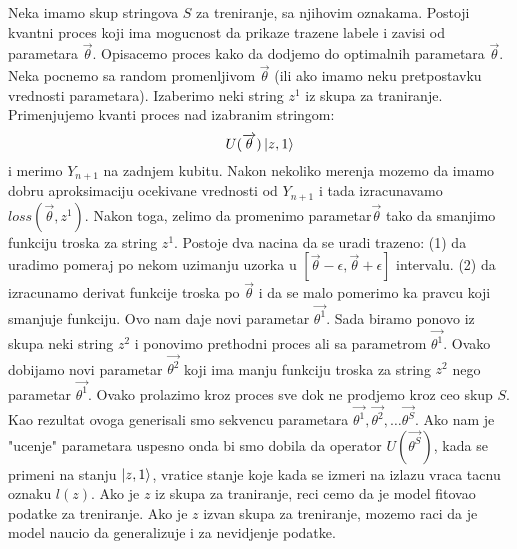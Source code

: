 \documentclass[12pt, letterpaper, oneside]{article}
\begin{document}
Neka imamo skup stringova \(S\) za treniranje, sa njihovim oznakama. Postoji kvantni proces koji ima mogucnost da
prikaze trazene labele i zavisi od parametara $\overrightarrow{\theta}$. Opisacemo proces kako da dodjemo do optimalnih parametara $\overrightarrow{\theta}$.
Neka pocnemo sa random promenljivom $\overrightarrow{\theta}$ (ili ako imamo neku pretpostavku vrednosti parametara). Izaberimo neki string $z^1$ iz skupa za traniranje.
Primenjujemo kvanti proces nad izabranim stringom:
\[
    U(\overrightarrow{\theta})\Ket{z,1}
\] 
i merimo $Y_{n+1}$ na zadnjem kubitu. Nakon nekoliko merenja mozemo da imamo dobru aproksimaciju ocekivane vrednosti od $Y_{n+1}$
i tada izracunavamo $\mathit{loss}(\overrightarrow{\theta},z^1)$. Nakon toga, zelimo da promenimo parametar$\overrightarrow{\theta}$ tako da smanjimo
funkciju troska za string $z^1$. Postoje dva nacina da se uradi trazeno: (1) da uradimo pomeraj po nekom uzimanju uzorka u $[\overrightarrow{\theta}-\epsilon,\overrightarrow{\theta}+\epsilon]$ intervalu.
(2) da izracunamo derivat funkcije troska po $\overrightarrow{\theta}$ i da se malo pomerimo ka pravcu koji smanjuje funkciju.
Ovo nam daje novi parametar $\overrightarrow{\theta^1}$. Sada biramo ponovo iz skupa neki string $z^2$ i ponovimo prethodni proces ali sa parametrom $\overrightarrow{\theta^1}$.
Ovako dobijamo novi parametar $\overrightarrow{\theta^2}$ koji ima manju funkciju troska za string $z^2$ nego parametar $\overrightarrow{\theta^1}$.
Ovako prolazimo kroz proces sve dok ne prodjemo kroz ceo skup $S$. Kao rezultat ovoga generisali smo sekvencu parametara
$\overrightarrow{\theta^1}, \overrightarrow{\theta^2}, \dots \overrightarrow{\theta^S}$. Ako nam je "ucenje" parametara uspesno onda bi smo dobila
da operator $U(\overrightarrow{\theta^S})$, kada se primeni na stanju $\Ket{z,1}$, vratice stanje koje kada se izmeri na izlazu vraca tacnu oznaku $l(z)$.
Ako je $z$ iz skupa za traniranje, reci cemo da je model fitovao podatke za treniranje. Ako je $z$ izvan skupa za treniranje, mozemo raci da je model naucio da generalizuje i za nevidjenje podatke.
\end{document}
